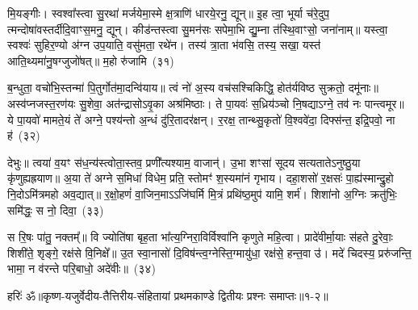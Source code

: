 मि॒यङ्गीः। स्वश्वा᳚स्त्वा सु॒रथा॑ मर्जयेमा॒स्मे क्ष॒त्राणि॑ धारये॒रनु॒ द्यून्॥ इ॒ह त्वा॒ भूर्या च॑रे॒दुप॒ त्मन्दोषा॑वस्तर्दीदि॒वाꣳ\-स॒मनु॒ द्यून्। कीड॑न्तस्त्वा सु॒मन॑सः सपेमा॒भि द्यु॒म्ना त॑स्थि॒वाꣳसो॒ जना॑नाम्॥ यस्त्वा॒ स्वश्वः॑ सुहिर॒ण्यो अ॑ग्न उप॒याति॒ वसु॑मता॒ रथे॑न। तस्य॑ त्रा॒ता भ॑वसि॒ तस्य॒ सखा॒ यस्त॑ आति॒थ्यमा॑नु॒षग्जुजो॑षत्॥ म॒हो रु॑जामि~(३१)\ip

ब॒न्धुता॒ वचो॑भि॒स्तन्मा॑ पि॒तुर्गोत॑मा॒दन्वि॑याय॥ त्वं नो॑ अ॒स्य वच॑सश्चिकिद्धि॒ होत॑र्यविष्ठ सुक्रतो॒ दमू॑नाः॥ अस्व॑प्नजस्त॒रण॑यः सु॒शेवा॒ अत॑न्द्रासो\-ऽवृ॒का अश्र॑मिष्ठाः। ते पा॒यवः॑ स॒ध्रिय॑ञ्चो नि॒षद्या\-ऽग्ने॒ तव॑ नः पान्त्वमूर॥ ये पा॒यवो॑ मामते॒यं ते॑ अग्ने॒ पश्य॑न्तो अ॒न्धं दु॑रि॒तादर॑क्षन्। र॒रक्ष॒ तान्थ्सु॒कृतो॑ वि॒श्ववे॑दा॒ दिफ्स॑न्त॒ इद्रि॒पवो॒ ना ह॑~(३२)\ip

देभुः॥ त्वया॑ व॒यꣳ स॑ध॒न्य॑स्त्वोता॒स्तव॒ प्रणी᳚त्यश्याम॒ वाजान्॑। उ॒भा शꣳसा॑ सूदय सत्यताते\-ऽनुष्ठु॒या कृ॑णुह्यह्रयाण॥ अ॒या ते॑ अग्ने स॒मिधा॑ विधेम॒ प्रति॒ स्तोमꣳ॑ श॒स्यमा॑नं गृभाय। दहा॒शसो॑ र॒क्षसः॑ पा॒ह्य॑स्मान्द्रु॒हो नि॒दो\-ऽमि॑त्रमहो अव॒द्यात्॥ र॒क्षो॒हणं॑ वा॒जिन॒मा\-ऽऽ\-जि॑घर्मि मि॒त्रं प्रथि॑ष्ठ॒मुप॑ यामि॒ शर्म॑। शिशा॑नो अ॒ग्निः क्रतु॑भिः॒ समि॑द्धः॒ स नो॒ दिवा॒~(३३)\ip

स रि॒षः पा॑तु॒ नक्तम्᳚॥ वि ज्योति॑षा बृह॒ता भा᳚त्य॒ग्निरा॒विर्विश्वा॑नि कृणुते महि॒त्वा। प्रादे॑वीर्मा॒याः स॑हते दु॒रेवाः॒ शिशी॑ते॒ शृङ्गे॒ रक्ष॑से वि॒निक्षे᳚॥ उ॒त स्वा॒नासो॑ दि॒विष॑न्त्व॒ग्नेस्ति॒ग्मायु॑धा॒ रक्ष॑से॒ हन्त॒वा उ॑। मदे॑ चिदस्य॒ प्ररु॑जन्ति॒ भामा॒ न व॑रन्ते परि॒बाधो॒ अदे॑वीः॥~(३४)\ip

{}

{हरिः॑ ॐ}{॥कृष्ण-यजुर्वेदीय-तैत्तिरीय-संहितायां प्रथमकाण्डे द्वितीयः प्रश्नः समाप्तः॥१-२॥}


